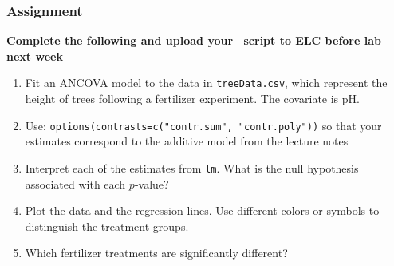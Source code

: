 \documentclass[color=usenames,dvipsnames]{beamer}\usepackage[]{graphicx}\usepackage[]{color}
\begin{document}
\begin{frame}[fragile]
  \frametitle{Assignment}
  {\bf \large Complete the following and upload your \R~script to ELC
    before lab next week \\}
  \vfill
  \begin{enumerate}
    \item Fit an ANCOVA model to the data in {\tt treeData.csv}, which
      represent the height of trees following a fertilizer
      experiment. The covariate is pH.
    \item Use: {\tt options(contrasts=c("contr.sum", "contr.poly"))}
      so that your estimates correspond to the additive model from the
      lecture notes
    \item Interpret each of the estimates from {\tt lm}. What is the
      null hypothesis associated with each $p$-value?
    \item Plot the data and the regression lines. Use different colors
      or symbols to distinguish the treatment groups.
    \item Which fertilizer treatments are significantly different?
  \end{enumerate}

\end{frame}
\end{document}
